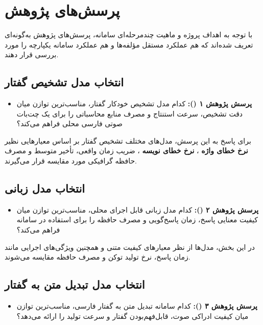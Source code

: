 \section{پرسش‌های پژوهش}

با توجه به اهداف پروژه و ماهیت چندمرحله‌ای سامانه،
پرسش‌های پژوهش به‌گونه‌ای تعریف شده‌اند که هم عملکرد مستقل
مؤلفه‌ها و هم عملکرد سامانه یکپارچه را مورد بررسی قرار دهند.

\subsection*{انتخاب مدل تشخیص گفتار}

\begin{itemize}
    \item
    \textbf{پرسش پژوهش ۱ ():}
    کدام مدل تشخیص خودکار گفتار، مناسب‌ترین توازن میان
    دقت تشخیص، سرعت استنتاج و مصرف منابع محاسباتی را
    برای یک چت‌بات صوتی فارسی محلی فراهم می‌کند؟
\end{itemize}

برای پاسخ به این پرسش، مدل‌های مختلف تشخیص گفتار بر اساس
معیارهایی نظیر
\textbf{نرخ خطای واژه}
،
\textbf{نرخ خطای نویسه}
،
ضریب زمان واقعی، تأخیر متوسط و مصرف حافظه گرافیکی
مورد مقایسه قرار می‌گیرند.


\subsection*{انتخاب مدل زبانی}

\begin{itemize}
    \item
    \textbf{پرسش پژوهش ۲ ():}
    کدام مدل زبانی قابل اجرای محلی، مناسب‌ترین توازن میان
    کیفیت معنایی پاسخ، زمان پاسخ‌گویی و مصرف حافظه را
    برای استفاده در سامانه فراهم می‌کند؟
\end{itemize}

در این بخش، مدل‌ها از نظر معیارهای کیفیت متنی و همچنین
ویژگی‌های اجرایی مانند زمان پاسخ، نرخ تولید توکن و مصرف
حافظه مقایسه می‌شوند.


\subsection*{انتخاب مدل تبدیل متن به گفتار}

\begin{itemize}
    \item
    \textbf{پرسش پژوهش ۳ ():}
    کدام سامانه تبدیل متن به گفتار فارسی، مناسب‌ترین توازن
    میان کیفیت ادراکی صوت، قابل‌فهم‌بودن گفتار و سرعت تولید
    را ارائه می‌دهد؟
\end{itemize}

